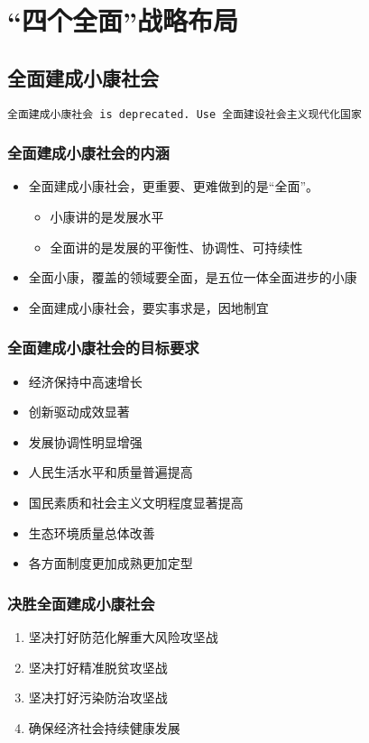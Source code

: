 \chapter{“四个全面”战略布局}

\section{全面建成小康社会}
    \verb|全面建成小康社会 is deprecated. Use 全面建设社会主义现代化国家|

    \subsection{全面建成小康社会的内涵}
        \begin{itemize}
            \item 全面建成小康社会，更重要、更难做到的是“全面”。
            \begin{itemize}
                \item 小康讲的是发展水平
                \item 全面讲的是发展的平衡性、协调性、可持续性
            \end{itemize}
            \item 全面小康，覆盖的领域要全面，是五位一体全面进步的小康
            \item 全面建成小康社会，要实事求是，因地制宜
        \end{itemize}

    \subsection{全面建成小康社会的目标要求}
        \begin{itemize}
            \item 经济保持中高速增长
            \item 创新驱动成效显著
            \item 发展协调性明显增强
            \item 人民生活水平和质量普遍提高
            \item 国民素质和社会主义文明程度显著提高
            \item 生态环境质量总体改善
            \item 各方面制度更加成熟更加定型
        \end{itemize}

    \subsection{决胜全面建成小康社会}
        \begin{enumerate}
            \item 坚决打好防范化解重大风险攻坚战
            \item 坚决打好精准脱贫攻坚战
            \item 坚决打好污染防治攻坚战
            \item 确保经济社会持续健康发展
        \end{enumerate}


